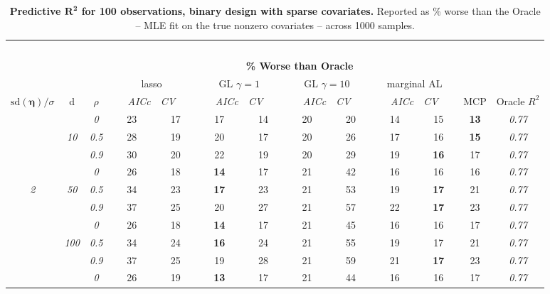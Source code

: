 \clearpage
\begin{table}
\vspace{-.2cm}
\footnotesize
\caption{ 
	{\bf  Predictive $\boldsymbol{R^2}$ for 100 observations, 
	binary design with sparse covariates.}
  Reported as  \% worse than the Oracle 
  -- MLE fit on the true nonzero covariates -- 
  across 1000 samples.}
\begin{center}
\begin{tabular}{ccc|cc|cc|cc|cc|c|c}
\hline &&&\multicolumn{9}{|c|}{~}\\[-1ex]
\multicolumn{3}{c}{~}&\multicolumn{9}{|c|}{\bf \% Worse than Oracle } &   \\[1ex]
& &
& \multicolumn{2}{c}{lasso} 
& \multicolumn{2}{c}{GL $\gamma=1$} 
& \multicolumn{2}{c}{GL $\gamma=10$} 
& \multicolumn{2}{c}{marginal AL} 
& \multicolumn{1}{c|}{~} & \\[-0.5ex]
$\mathrm{sd}(\boldsymbol{\eta})/\sigma$ & {\sf d} & $\rho$ 
& ~~~\scriptsize\it AICc & \multicolumn{1}{c}{\scriptsize\it CV~~~}
& ~~~\scriptsize\it AICc & \multicolumn{1}{c}{\scriptsize\it CV~~~}
& ~~~\scriptsize\it AICc & \multicolumn{1}{c}{\scriptsize\it CV~~~}
& ~~~\scriptsize\it AICc & \multicolumn{1}{c}{\scriptsize\it CV~~~} 
& \multicolumn{1}{c|}{ MCP} & Oracle $R^2$ \\[.5ex]
\hline\rule{0pt}{3ex}
& & \it  0  & 23 & 17 & 17 & 14 & 20 & 20 & 14 & 15 & {\bf 13} & \it  0.77 \\
 & \it  10  & \it  0.5  & 28 & 19 & 20 & 17 & 20 & 26 & 17 & 16 & {\bf 15} & \it  0.77 \\
& & \it  0.9  & 30 & 20 & 22 & 19 & 20 & 29 & 19 & {\bf 16} & 17 & \it  0.77 \\[1ex]
\cline{2-3}\rule{0pt}{3ex}
& & \it  0  & 26 & 18 & {\bf 14} & 17 & 21 & 42 & 16 & 16 & 16 & \it  0.77 \\
\it  2  & \it  50  & \it  0.5  & 34 & 23 & {\bf 17} & 23 & 21 & 53 & 19 & {\bf 17} & 21 & \it  0.77 \\
& & \it  0.9  & 37 & 25 & 20 & 27 & 21 & 57 & 22 & {\bf 17} & 23 & \it  0.77 \\[1ex]
\cline{2-3}\rule{0pt}{3ex}
& & \it  0  & 26 & 18 & {\bf 14} & 17 & 21 & 45 & 16 & 16 & 17 & \it  0.77 \\
 & \it  100  & \it  0.5  & 34 & 24 & {\bf 16} & 24 & 21 & 55 & 19 & 17 & 21 & \it  0.77 \\
& & \it  0.9  & 37 & 25 & 19 & 28 & 21 & 59 & 21 & {\bf 17} & 23 & \it  0.77 \\[1ex]
\cline{2-3}\rule{0pt}{3ex}
& & \it  0  & 26 & 19 & {\bf 13} & 17 & 21 & 44 & 16 & 16 & 17 & \it  0.77 \\

\end{tabular}
\end{center}
\end{table}
